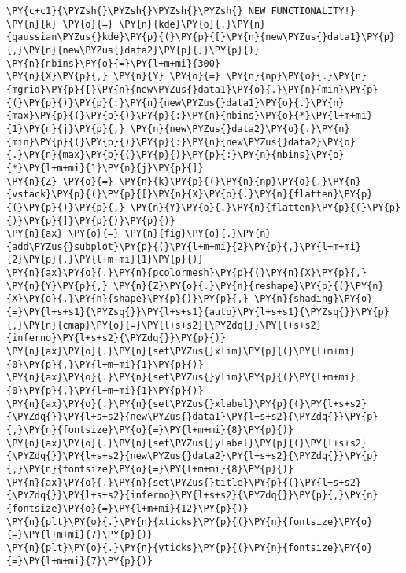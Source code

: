 \begin{tcolorbox}[breakable, size=fbox, boxrule=1pt, pad at break*=1mm,colback=cellbackground, colframe=cellborder]
\begin{Verbatim}[commandchars=\\\{\}]
\PY{c+c1}{\PYZsh{}\PYZsh{}\PYZsh{}\PYZsh{} NEW FUNCTIONALITY!}
\PY{n}{k} \PY{o}{=} \PY{n}{kde}\PY{o}{.}\PY{n}{gaussian\PYZus{}kde}\PY{p}{(}\PY{p}{[}\PY{n}{new\PYZus{}data1}\PY{p}{,}\PY{n}{new\PYZus{}data2}\PY{p}{]}\PY{p}{)}
\PY{n}{nbins}\PY{o}{=}\PY{l+m+mi}{300}
\PY{n}{X}\PY{p}{,} \PY{n}{Y} \PY{o}{=} \PY{n}{np}\PY{o}{.}\PY{n}{mgrid}\PY{p}{[}\PY{n}{new\PYZus{}data1}\PY{o}{.}\PY{n}{min}\PY{p}{(}\PY{p}{)}\PY{p}{:}\PY{n}{new\PYZus{}data1}\PY{o}{.}\PY{n}{max}\PY{p}{(}\PY{p}{)}\PY{p}{:}\PY{n}{nbins}\PY{o}{*}\PY{l+m+mi}{1}\PY{n}{j}\PY{p}{,} \PY{n}{new\PYZus{}data2}\PY{o}{.}\PY{n}{min}\PY{p}{(}\PY{p}{)}\PY{p}{:}\PY{n}{new\PYZus{}data2}\PY{o}{.}\PY{n}{max}\PY{p}{(}\PY{p}{)}\PY{p}{:}\PY{n}{nbins}\PY{o}{*}\PY{l+m+mi}{1}\PY{n}{j}\PY{p}{]}
\PY{n}{Z} \PY{o}{=} \PY{n}{k}\PY{p}{(}\PY{n}{np}\PY{o}{.}\PY{n}{vstack}\PY{p}{(}\PY{p}{[}\PY{n}{X}\PY{o}{.}\PY{n}{flatten}\PY{p}{(}\PY{p}{)}\PY{p}{,} \PY{n}{Y}\PY{o}{.}\PY{n}{flatten}\PY{p}{(}\PY{p}{)}\PY{p}{]}\PY{p}{)}\PY{p}{)}
\PY{n}{ax} \PY{o}{=} \PY{n}{fig}\PY{o}{.}\PY{n}{add\PYZus{}subplot}\PY{p}{(}\PY{l+m+mi}{2}\PY{p}{,}\PY{l+m+mi}{2}\PY{p}{,}\PY{l+m+mi}{1}\PY{p}{)}
\PY{n}{ax}\PY{o}{.}\PY{n}{pcolormesh}\PY{p}{(}\PY{n}{X}\PY{p}{,} \PY{n}{Y}\PY{p}{,} \PY{n}{Z}\PY{o}{.}\PY{n}{reshape}\PY{p}{(}\PY{n}{X}\PY{o}{.}\PY{n}{shape}\PY{p}{)}\PY{p}{,} \PY{n}{shading}\PY{o}{=}\PY{l+s+s1}{\PYZsq{}}\PY{l+s+s1}{auto}\PY{l+s+s1}{\PYZsq{}}\PY{p}{,}\PY{n}{cmap}\PY{o}{=}\PY{l+s+s2}{\PYZdq{}}\PY{l+s+s2}{inferno}\PY{l+s+s2}{\PYZdq{}}\PY{p}{)}
\PY{n}{ax}\PY{o}{.}\PY{n}{set\PYZus{}xlim}\PY{p}{(}\PY{l+m+mi}{0}\PY{p}{,}\PY{l+m+mi}{1}\PY{p}{)}
\PY{n}{ax}\PY{o}{.}\PY{n}{set\PYZus{}ylim}\PY{p}{(}\PY{l+m+mi}{0}\PY{p}{,}\PY{l+m+mi}{1}\PY{p}{)}
\PY{n}{ax}\PY{o}{.}\PY{n}{set\PYZus{}xlabel}\PY{p}{(}\PY{l+s+s2}{\PYZdq{}}\PY{l+s+s2}{new\PYZus{}data1}\PY{l+s+s2}{\PYZdq{}}\PY{p}{,}\PY{n}{fontsize}\PY{o}{=}\PY{l+m+mi}{8}\PY{p}{)}
\PY{n}{ax}\PY{o}{.}\PY{n}{set\PYZus{}ylabel}\PY{p}{(}\PY{l+s+s2}{\PYZdq{}}\PY{l+s+s2}{new\PYZus{}data2}\PY{l+s+s2}{\PYZdq{}}\PY{p}{,}\PY{n}{fontsize}\PY{o}{=}\PY{l+m+mi}{8}\PY{p}{)}
\PY{n}{ax}\PY{o}{.}\PY{n}{set\PYZus{}title}\PY{p}{(}\PY{l+s+s2}{\PYZdq{}}\PY{l+s+s2}{inferno}\PY{l+s+s2}{\PYZdq{}}\PY{p}{,}\PY{n}{fontsize}\PY{o}{=}\PY{l+m+mi}{12}\PY{p}{)}
\PY{n}{plt}\PY{o}{.}\PY{n}{xticks}\PY{p}{(}\PY{n}{fontsize}\PY{o}{=}\PY{l+m+mi}{7}\PY{p}{)}
\PY{n}{plt}\PY{o}{.}\PY{n}{yticks}\PY{p}{(}\PY{n}{fontsize}\PY{o}{=}\PY{l+m+mi}{7}\PY{p}{)}


\end{Verbatim}
\end{tcolorbox}
